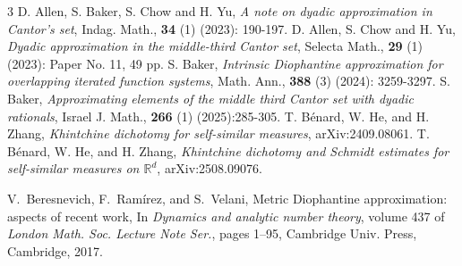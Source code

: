 \documentclass[12pt]{article}
\theoremstyle{definition}
\theoremstyle{remark}
\renewcommand{\emph}[1]{{\it#1}}
\begin{document}
\begin{thebibliography}{3}
 D. Allen, S. Baker, S. Chow and H. Yu, \emph{A note on dyadic approximation in Cantor's set}, Indag. Math.,  \textbf{34} (1) (2023): 190-197.
 D. Allen, S. Chow and H. Yu, \emph{Dyadic approximation in the middle-third Cantor set}, Selecta Math., \textbf{29} (1) (2023): Paper No. 11, 49 pp.
 S. Baker, \emph{Intrinsic Diophantine approximation for overlapping iterated function systems}, Math. Ann., \textbf{388} (3) (2024): 3259-3297.
 S. Baker, \emph{Approximating elements of the middle third Cantor set with dyadic rationals}, Israel J. Math., \textbf{266} (1) (2025):285-305.
 T. B\'{e}nard, W. He, and H. Zhang, \emph{Khintchine dichotomy for self-similar measures}, arXiv:2409.08061.
 T. B\'{e}nard, W. He, and H. Zhang, \emph{Khintchine dichotomy and Schmidt estimates for self-similar measures on $\mathbb{R}^{d}$}, arXiv:2508.09076.


V.~Beresnevich, F.~Ram\'irez, and S.~Velani,
\newblock Metric {D}iophantine approximation: aspects of recent work,
\newblock In {\em Dynamics and analytic number theory}, volume 437 of {\em
  London Math. Soc. Lecture Note Ser.}, pages 1--95, Cambridge Univ. Press,
  Cambridge, 2017.



\end{thebibliography}
\end{document}
